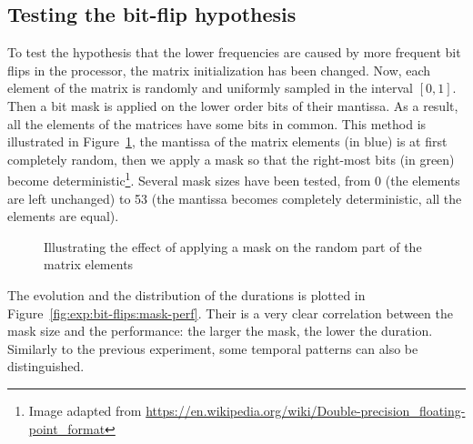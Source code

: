         \subsection{Testing the bit-flip hypothesis}
            To test the hypothesis that the lower frequencies are caused by more frequent bit flips in the processor,
            the matrix initialization has been changed. Now, each element of the matrix is randomly and uniformly
            sampled in the interval \([0,1]\). Then a bit mask is applied on the lower order bits of their mantissa. As
            a result, all the elements of the matrices have some bits in common. This method is illustrated in
            Figure~\ref{fig:exp:bit-flips:mask_illustration}, the mantissa of the matrix elements (in blue) is at first
            completely random, then we apply a mask so that the right-most bits (in green) become
            deterministic\footnote{Image adapted from
            \url{https://en.wikipedia.org/wiki/Double-precision_floating-point_format}}.  Several mask sizes have been
            tested, from 0 (the elements are left unchanged) to 53 (the mantissa becomes completely deterministic, all
            the elements are equal).
            \begin{figure}[htpb]
                \begin{center}
                    
                    \vspace{-0.2cm}


                    \vspace{-0.2cm}
                    
                \end{center}
                \caption{Illustrating the effect of applying a mask on the random part of the matrix
                elements\label{fig:exp:bit-flips:mask_illustration}}
            \end{figure}

            The evolution and the distribution of the \dgemm durations is plotted in
            Figure~\ref{fig:exp:bit-flips:mask-perf}. Their is a very clear correlation between the mask size and the
            performance: the larger the mask, the lower the duration. Similarly to the previous experiment, some
            temporal patterns can also be distinguished.

